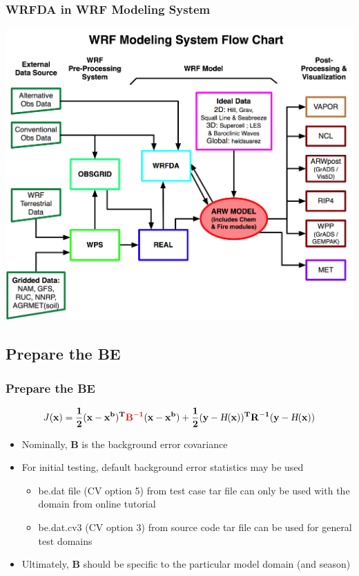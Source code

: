 \documentclass{beamer}
\begin{document}
\begin{frame}
\frametitle{WRFDA in WRF Modeling System}
\begin{center}
\includegraphics[scale=0.4]{wrfFlowChart}
\end{center}
\end{frame}

\subsection{Prepare the BE}
\begin{frame}
\frametitle{Prepare the BE}
\begin{equation*}
J(\bf{x})=\frac{1}{2}(\bf{x}-\bf{x}^b)^T{\color{red}\bf{B}^{-1}}(\bf{x}-\bf{x}^b)+\frac{1}{2}(\bf{y}-\textsl{H}(\bf{x}))^T\bf{R}^{-1}(\bf{y}-\textsl{H}(\bf{x}))
\end{equation*}
\begin{itemize}
\item Nominally, {\color{red}$\mathbf{B}$} is the background error covariance \pause
\item For initial testing, default background error statistics may
be used \pause 
\begin{itemize}
\item be.dat file (CV option 5) from test case tar file can only be used
with the domain from online tutorial \pause
\item be.dat.cv3 (CV option 3) from source code tar file can be used for
general test domains 
\end{itemize} \pause
\item Ultimately, {\color{red}$\mathbf{B}$} should be specific to the particular
model domain (and season)
\end{itemize}
\end{frame}
\end{document}
